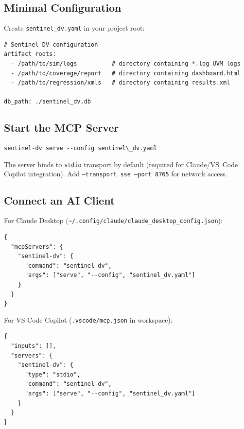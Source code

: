 \documentclass[11pt,a4paper]{article}
\begin{document}
\subsection{Minimal Configuration}

Create \texttt{sentinel\_dv.yaml} in your project root:

\begin{lstlisting}[style=yaml,caption={Minimal sentinel\_dv.yaml}]
# Sentinel DV configuration
artifact_roots:
  - /path/to/sim/logs          # directory containing *.log UVM logs
  - /path/to/coverage/report   # directory containing dashboard.html
  - /path/to/regression/xmls   # directory containing results.xml

db_path: ./sentinel_dv.db
\end{lstlisting}

\subsection{Start the MCP Server}
\begin{lstlisting}[style=yaml,numbers=none,xleftmargin=0em]
sentinel-dv serve --config sentinel\_dv.yaml
\end{lstlisting}

The server binds to \texttt{stdio} transport by default (required for Claude/VS~Code
Copilot integration). Add \texttt{--transport sse --port 8765} for network access.

\subsection{Connect an AI Client}

For Claude Desktop (\texttt{\textasciitilde/.config/claude/claude\_desktop\_config.json}):
\begin{lstlisting}[style=yaml,caption={Claude Desktop MCP config}]
{
  "mcpServers": {
    "sentinel-dv": {
      "command": "sentinel-dv",
      "args": ["serve", "--config", "sentinel_dv.yaml"]
    }
  }
}
\end{lstlisting}

For VS Code Copilot (\texttt{.vscode/mcp.json} in workspace):
\begin{lstlisting}[style=yaml,caption={VS Code Copilot MCP config}]
{
  "inputs": [],
  "servers": {
    "sentinel-dv": {
      "type": "stdio",
      "command": "sentinel-dv",
      "args": ["serve", "--config", "sentinel_dv.yaml"]
    }
  }
}
\end{lstlisting}
\end{document}
